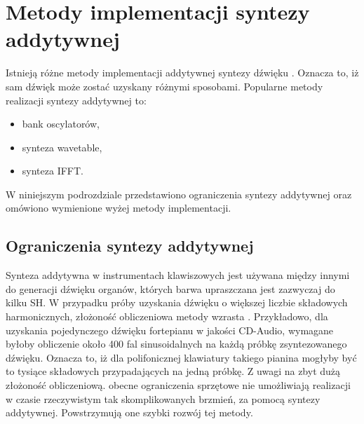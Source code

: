 \section{Metody implementacji syntezy addytywnej}
Istnieją różne metody implementacji addytywnej syntezy dźwięku \cite{add_imp_meth}. Oznacza to, iż sam dźwięk może zostać uzyskany różnymi sposobami. Popularne metody realizacji syntezy addytywnej to:
\begin{itemize}
	\item bank oscylatorów,
	\item synteza wavetable,
	\item synteza IFFT.
\end{itemize}
W niniejszym podrozdziale przedstawiono ograniczenia syntezy addytywnej oraz omówiono wymienione wyżej metody implementacji.

\subsection{Ograniczenia syntezy addytywnej} \label{addit_ograniczenia}
Synteza addytywna w instrumentach klawiszowych jest używana między innymi do generacji dźwięku organów, których barwa upraszczana jest zazwyczaj do kilku SH. W przypadku próby uzyskania dźwięku o większej liczbie składowych harmonicznych, złożoność obliczeniowa metody wzrasta \cite{add_ograniczenia}.
Przykładowo, dla uzyskania pojedynczego dźwięku fortepianu w jakości CD-Audio,
wymagane byłoby obliczenie około 400 fal sinusoidalnych na każdą próbkę zsyntezowanego dźwięku. Oznacza to, iż dla polifonicznej klawiatury takiego pianina mogłyby być to tysiące składowych przypadających na jedną próbkę. Z uwagi na zbyt dużą złożoność obliczeniową. obecne ograniczenia sprzętowe nie umożliwiają realizacji w czasie rzeczywistym tak skomplikowanych brzmień, za pomocą syntezy addytywnej. Powstrzymują one szybki rozwój tej metody.

